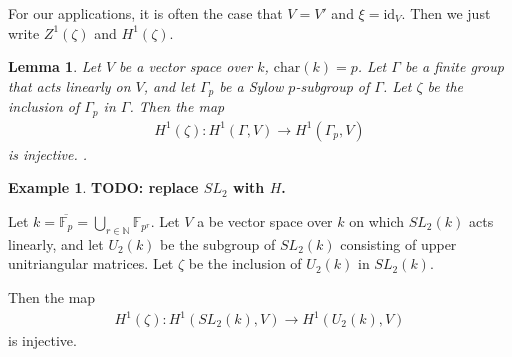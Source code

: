 \documentclass[12pt]{amsart}
\numberwithin{equation}{section}
\newtheorem{lem}[equation]{Lemma}
\theoremstyle{definition}
\newtheorem{ex}[equation]{Example}
\theoremstyle{remark}
\theoremstyle{remark}
\begin{document}
For our applications, it is often the case that $V=V'$ and $\xi=\mathrm{id}_V$. Then we just write $Z^1(\zeta)$ and $H^1(\zeta)$.

\begin{lem} \label{brown}
Let $V$ be a vector space over $k$, $\mathrm{char}(k) = p$. Let $\Gamma$ be a finite group that acts linearly on $V$, and let $\Gamma_p$ be a \emph{Sylow $p$-subgroup} of $\Gamma$. Let $\zeta$ be the inclusion of $\Gamma_p$ in $\Gamma$. Then the map 
\begin{align*}
H^1(\zeta):H^1(\Gamma, V)\rightarrow H^1(\Gamma_p, V)
\end{align*}
is injective. \cite[III.10.4 Prop.]{brown1982cohomology}.
\end{lem}

\begin{ex} \label{ab_example} \textbf{TODO: replace $SL_2$ with $H$.}

Let $k = \overline{\mathbb{F}_p} = \bigcup_{r\in \mathbb{N}} \mathbb{F}_{p^r}$.
Let $V$ a be vector space over $k$ on which $SL_2(k)$ acts linearly, and let $U_2(k)$ be the subgroup of $SL_2(k)$ consisting of upper unitriangular matrices. Let $\zeta$ be the inclusion of $U_2(k)$ in $SL_2(k)$.

Then the map
	\begin{align}
		H^1(\zeta): H^1(SL_2(k), V) \rightarrow H^1(U_2(k), V)
	\end{align}
	is injective.
\label{eg:sl2ab}
\end{ex}
\end{document}
